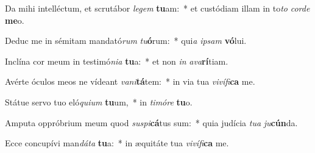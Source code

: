 \item Da mihi intelléctum, et scrutábor \textit{le}\textit{gem} \textbf{tu}am:~* et custódiam illam in to\textit{to} \textit{cor}\textit{de} \textbf{me}o.
\item Deduc me in sémitam mandató\textit{rum} \textit{tu}\textbf{ó}rum:~* qui\textit{a} \textit{ip}\textit{sam} \textbf{vó}lui.
\item Inclína cor meum in testimó\textit{ni}\textit{a} \textbf{tu}a:~* et non \textit{in} \textit{a}\textit{va}\textbf{rí}tiam.
\item Avérte óculos meos ne vídeant \textit{va}\textit{ni}\textbf{tá}tem:~* in via tua \textit{vi}\textit{ví}\textit{fi}\textbf{ca} me.
\item Státue servo tuo eló\textit{qui}\textit{um} \textbf{tu}um,~* in \textit{ti}\textit{mó}\textit{re} \textbf{tu}o.
\item Amputa oppróbrium meum quod \textit{su}\textit{spi}\textbf{cá}tus sum:~* quia judícia \textit{tu}\textit{a} \textit{ju}\textbf{cún}da.
\item Ecce concupívi man\textit{dá}\textit{ta} \textbf{tu}a:~* in æquitáte tua \textit{vi}\textit{ví}\textit{fi}\textbf{ca} me.
